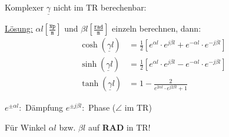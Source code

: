 Komplexer $\underline{\gamma}$ nicht im TR berechenbar:

\underline{Lösung:} $\alpha l \left[ \tfrac{\texttt{Np}}{\texttt{m}} \right] $
und $ \beta l \left[ \tfrac{\texttt{rad}}{\texttt{m}} \right] $ einzeln
berechnen, dann:
\begin{align*}
	\cosh(\underline{\gamma}l)  & = \frac{1}{2} \left[e^{\alpha l} \cdot e^{j\beta l} + e^{-\alpha l} \cdot e^{-j\beta l} \right] \\
	\sinh (\underline{\gamma}l) & = \frac{1}{2} \left[e^{\alpha l} \cdot e^{j\beta l} - e^{-\alpha l} \cdot e^{-j\beta l} \right] \\
	\tanh(\underline{\gamma}l)  & =
	1-\frac{2}{e^{2\alpha l} \cdot e^{j2\beta l}+1}
\end{align*}

$e^{\pm \alpha l }:$ Dämpfung \qquad $e^{\pm j\beta l}:$ Phase ($\angle$ im TR)

Für Winkel $\alpha l$ bzw. $ \beta l$ auf \textbf{RAD} in TR!

